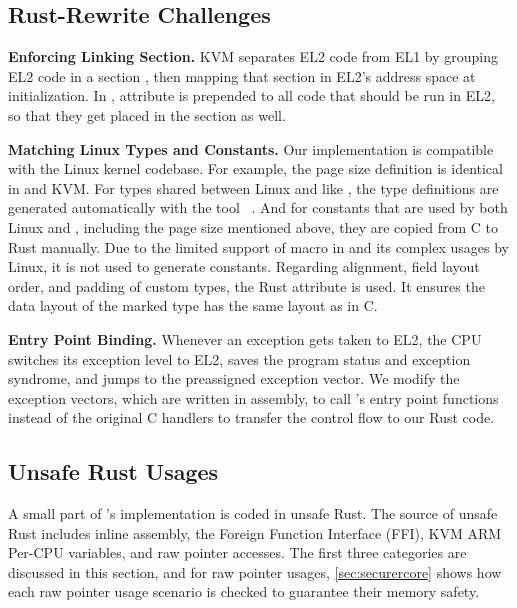 \subsection{Rust-Rewrite Challenges}
\textbf{Enforcing Linking Section.}
KVM separates EL2 code from EL1 by grouping EL2 code in a section
, then mapping that section in EL2's address space at
initialization.
In \rustcore{}, attribute \code{\#[link\_section = ".hyp.text"]} is prepended
to all code that should be run in EL2, so that they get placed in the
 section as well.

\textbf{Matching Linux Types and Constants.}
Our implementation is compatible with the Linux kernel codebase. For example,
the page size definition is identical in \rustcore{} and KVM.
For types shared between Linux and \rustcore{} like , the type
definitions are generated automatically with the tool
~\cite{bindgen}. And for constants that are used by both Linux
and \rustcore{}, including the page size mentioned above, they are copied from C
to Rust manually. Due to the limited support of macro in  and its
complex usages by Linux, it is not used to generate constants.
Regarding alignment, field layout order, and padding of custom types, the Rust
attribute \code{\#[repr\-(C)]} is used. It ensures the data layout of the
marked type has the same layout as in C.

\textbf{Entry Point Binding.}
Whenever an exception gets taken to EL2, the CPU switches its exception level
to EL2, saves the program status and exception syndrome, and jumps to the
preassigned exception vector.
We modify the exception vectors, which are written in assembly, to call
\rustcore{}'s entry point functions instead of the original C handlers to
transfer the control flow to our Rust code.

\subsection{Unsafe Rust Usages}

A small part of \rustcore{}'s implementation is coded in unsafe Rust.
The source of unsafe Rust includes inline assembly, the Foreign Function
Interface (FFI), KVM ARM Per-CPU variables, and raw pointer accesses.
The first three categories are discussed in this section,
and for raw pointer usages, \autoref{sec:securercore} shows how each raw
pointer usage scenario is checked to guarantee their memory safety.


